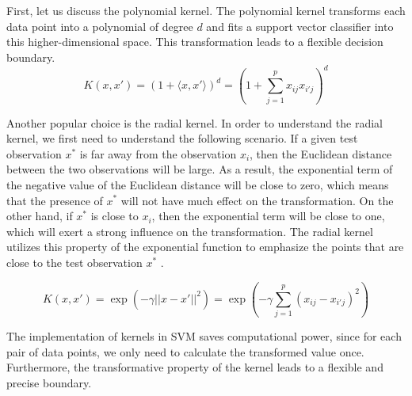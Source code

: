First, let us discuss the polynomial kernel. The polynomial kernel transforms each data point into a polynomial
of degree $d$ and fits a support vector classifier into this higher-dimensional space. This 
transformation leads to a flexible decision boundary. 
\begin{equation}
    K(x, x') = (1 + \langle x, x' \rangle)^d = (1 + \sum_{j=1}^px_{ij}x_{i'j})^d
\end{equation}

Another popular choice is the radial kernel. In order to understand the radial kernel, we first need to understand
the following scenario.
If a given test observation $x^*$ is far away from the observation $x_i$,
then the Euclidean distance between the two observations will be large.
As a result, the exponential term of the negative value of the Euclidean distance will be close to zero,
which means that the presence of $x^*$ will not have much effect on the transformation.
On the other hand, if $x^*$ is close to $x_i$, then the exponential term will be close to one, which
will exert a strong influence on the transformation. The radial kernel utilizes this property of the
exponential function to emphasize the points that are close to the test observation $x^*$ \cite{R9}.

\begin{equation}
    K(x, x') = \exp(-\gamma ||x - x'||^2) = \exp(-\gamma \sum_{j=1}^p(x_{ij} - x_{i'j})^2)
\end{equation}

The implementation of kernels in SVM saves computational power, since for each pair of data points, we
only need to calculate the transformed value once. Furthermore, the transformative property of the
kernel leads to a flexible and precise boundary. \cite{R9}
